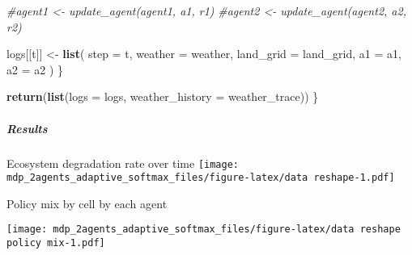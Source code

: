 \documentclass[
]{article}
\newenvironment{Shaded}{\begin{snugshade}}{\end{snugshade}}
\newcommand{\AttributeTok}[1]{\textcolor[rgb]{0.13,0.29,0.53}{#1}}
\newcommand{\CommentTok}[1]{\textcolor[rgb]{0.56,0.35,0.01}{\textit{#1}}}
\newcommand{\FunctionTok}[1]{\textcolor[rgb]{0.13,0.29,0.53}{\textbf{#1}}}
\newcommand{\NormalTok}[1]{#1}
\newcommand{\OtherTok}[1]{\textcolor[rgb]{0.56,0.35,0.01}{#1}}
\begin{document}
\begin{Shaded}
\begin{Highlighting}[]
    \CommentTok{\#agent1 \textless{}{-} update\_agent(agent1, a1, r1)}
    \CommentTok{\#agent2 \textless{}{-} update\_agent(agent2, a2, r2)}
    
\NormalTok{    logs[[t]] }\OtherTok{\textless{}{-}} \FunctionTok{list}\NormalTok{(}
      \AttributeTok{step =}\NormalTok{ t,}
      \AttributeTok{weather =}\NormalTok{ weather,}
      \AttributeTok{land\_grid =}\NormalTok{ land\_grid,}
      \AttributeTok{a1 =}\NormalTok{ a1,}
      \AttributeTok{a2 =}\NormalTok{ a2}
\NormalTok{    )}
\NormalTok{  \}}
  
  \FunctionTok{return}\NormalTok{(}\FunctionTok{list}\NormalTok{(}\AttributeTok{logs =}\NormalTok{ logs, }\AttributeTok{weather\_history =}\NormalTok{ weather\_trace))}
\NormalTok{\}}
\end{Highlighting}
\end{Shaded}

\hypertarget{results}{%
\subparagraph{Results}\label{results}}

Ecosystem degradation rate over time
\texttt{[image: mdp\_2agents\_adaptive\_softmax\_files/figure-latex/data reshape-1.pdf]}

Policy mix by cell by each agent

\texttt{[image: mdp\_2agents\_adaptive\_softmax\_files/figure-latex/data reshape policy mix-1.pdf]}
\end{document}
